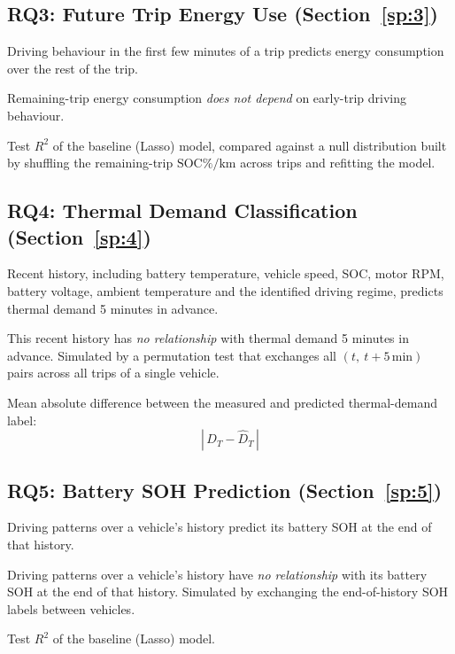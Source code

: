 \documentclass[11pt,letterpaper]{article}
\newenvironment{rqblock}{\par\noindent\begin{minipage}{\linewidth}\setlength{\parskip}{4pt}}{\end{minipage}\par}
\newcommand{\socpk}{\mathrm{SOC\%/km}}
\begin{document}
\subsection{RQ3: Future Trip Energy Use \textnormal{(Section~\ref{sp:3})}}
\begin{rqblock}\begin{hyp}
  \item[Hypothesis:] Driving behaviour in the first few minutes of a trip predicts energy consumption over the rest of the trip.
  \item[Null hypothesis ($H_0$):] Remaining-trip energy consumption \textit{does not depend} on early-trip driving behaviour.
  \item[Test statistic:] Test $R^2$ of the baseline (Lasso) model, compared against a null distribution built by shuffling the remaining-trip $\socpk$ across trips and refitting the model.
\end{hyp}\end{rqblock}

\subsection{RQ4: Thermal Demand Classification \textnormal{(Section~\ref{sp:4})}}
\begin{rqblock}\begin{hyp}
  \item[Hypothesis:] Recent history, including battery temperature, vehicle speed, SOC, motor RPM, battery voltage, ambient temperature and the identified driving regime, predicts thermal demand 5 minutes in advance.
  \item[Null hypothesis ($H_0$):] This recent history has \textit{no relationship} with thermal demand 5 minutes in advance. Simulated by a permutation test that exchanges all $(t,\ t+5\,\text{min})$ pairs across all trips of a single vehicle.
  \item[Test statistic:] Mean absolute difference between the measured and predicted thermal-demand label:\[\left|\,D_T - \widehat{D}_T\,\right|\]
\end{hyp}\end{rqblock}

\subsection{RQ5: Battery SOH Prediction \textnormal{(Section~\ref{sp:5})}}
\begin{rqblock}\begin{hyp}
  \item[Hypothesis:] Driving patterns over a vehicle's history predict its battery SOH at the end of that history.
  \item[Null hypothesis ($H_0$):] Driving patterns over a vehicle's history have \textit{no relationship} with its battery SOH at the end of that history. Simulated by exchanging the end-of-history SOH labels between vehicles.
  \item[Test statistic:] Test $R^2$ of the baseline (Lasso) model.
\end{hyp}\end{rqblock}
\end{document}
